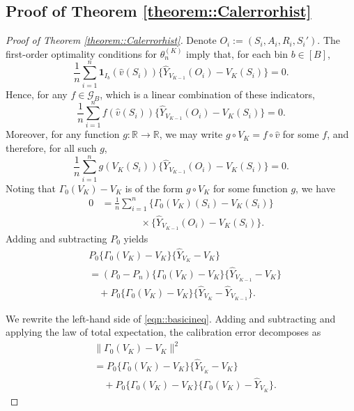 \documentclass{article}
\theoremstyle{plain}
\theoremstyle{definition}
\theoremstyle{remark}
\begin{document}
 


\subsection{Proof of Theorem \ref{theorem::Calerrorhist}}
\begin{proof}[Proof of Theorem \ref{theorem::Calerrorhist}]
Denote $O_i := (S_i, A_i, R_i, S_i')$. The first-order optimality conditions for
$\theta_n^{(K)}$ imply that, for each bin $b \in [B]$,
\[
\frac{1}{n}\sum_{i=1}^n 
\mathbf{1}_{I_b}(\hat{v}(S_i))
\big\{
\widehat Y_{V_{K-1}}(O_i)
- V_K(S_i)
\big\}
= 0.
\]
Hence, for any $f \in \mathcal G_B$, which is a linear combination of these
indicators,
\begin{equation}
\label{eqn::scores}
\frac{1}{n}\sum_{i=1}^n 
f(\hat{v}(S_i))
\big\{
\widehat Y_{V_{K-1}}(O_i)
- V_K(S_i)
\big\}
= 0.
\end{equation}
Moreover, for any function $g:\mathbb{R}\to\mathbb{R}$, we may write
$g \circ V_K = f \circ \hat{v}$ for some $f$, and therefore,
for all such $g$,
\[
\frac{1}{n}\sum_{i=1}^n 
g(V_K(S_i))
\big\{
\widehat Y_{V_{K-1}}(O_i)
- V_K(S_i)
\big\}
= 0.
\]
Noting that \(\Gamma_0(V_K) - V_K\) is of the form
\(g \circ V_K\) for some function \(g\), we have
\begin{align*}
0
&=
\frac{1}{n}\sum_{i=1}^n 
\Big\{
\Gamma_0(V_K)(S_i) - V_K(S_i)
\Big\} \\
&\qquad\qquad\times
\Big\{
\widehat Y_{V_{K-1}}(O_i)
- V_K(S_i)
\Big\}.
\end{align*}
Adding and subtracting \(P_0\) yields
\begin{equation}
\label{eqn::basicineq}
\begin{aligned}
&P_0
\Big\{
\Gamma_0(V_K) - V_K
\Big\}
\Big\{
\widehat Y_{V_K}
- V_K
\Big\}\\
& = (P_0 - P_n)
\Big\{
\Gamma_0(V_K) - V_K
\Big\}
\Big\{
\widehat Y_{V_{K-1}}
- V_K
\Big\}\\
&\quad  + P_0
\Big\{
\Gamma_0(V_K) - V_K
\Big\}
\Big\{
\widehat Y_{V_K}
- \widehat Y_{V_{K-1}}
\Big\}.
\end{aligned}
\end{equation}


We rewrite the left-hand side of \eqref{eqn::basicineq}.
Adding and subtracting and applying the law of total expectation, the calibration error decomposes as
\begin{equation}
\label{eqn::calerrorbound}
\begin{aligned}
&\| \Gamma_0(V_K) - V_K\|^2\\
&=
P_0
\Big\{
\Gamma_0(V_K) - V_K
\Big\}
\Big\{
\widehat Y_{V_K}
- V_K
\Big\} \\
&\quad+
P_0
\Big\{
\Gamma_0(V_K) - V_K
\Big\}
\Big\{
\Gamma_0(V_K)
- \widehat Y_{V_K}
\Big\}.
\end{aligned}
\end{equation}


\end{proof}
\end{document}
